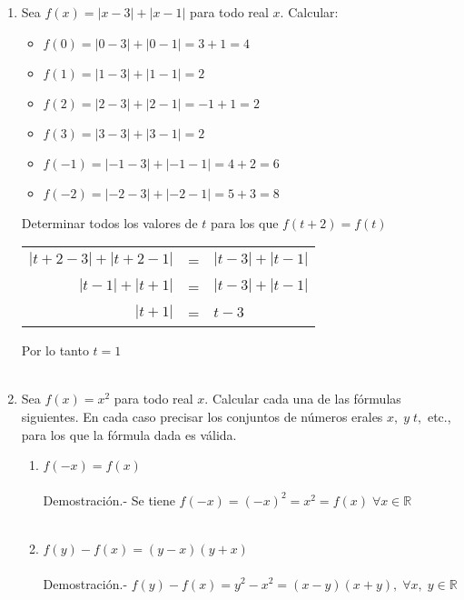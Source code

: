 \begin{enumerate}
        \item Sea $f(x)=|x-3|+|x-1|$ para todo real $x$. Calcular:\\
            \begin{itemize}
                \item $f(0) = |0-3|+|0-1| = 3 + 1 = 4$
                \item $f(1) = |1-3|+|1-1| = 2$
                \item $f(2) = |2-3|+|2-1| = -1 + 1 = 2$
                \item $f(3) = |3-3|+|3-1| = 2$
                \item $f(-1) = |-1-3|+|-1-1| = 4 + 2 = 6$
                \item $f(-2) = |-2-3|+|-2-1| = 5 + 3 = 8$\\
            \end{itemize}
            Determinar todos los valores de $t$ para los que $f(t+2)=f(t)$\\
            \begin{center}
                \begin{tabular}{r c l}
                    $|t+2-3| + |t+2-1|$&=&$|t-3| + |t-1|$\\
                    $|t-1|+|t+1|$&=&$|t-3|+|t-1|$\\
                    $|t+1|$&=&$t-3$\\
                \end{tabular}
            \end{center}
            Por lo tanto  $t=1$\\\\

        \item Sea $f(x)=x^2$  para todo real $x$. Calcular cada una de las fórmulas siguientes. En cada caso precisar los conjuntos de números erales $x, \; y \; t,$ etc., para los que la fórmula dada es válida.
            \begin{enumerate}[\bfseries (a)]
                \item $f(-x)=f(x)$ \\\\
                Demostración.- \; Se tiene $f(-x) = (-x)^2 = x^2 = f(x) \; \forall x \in \mathbb{R}$\\\\

                \item $f(y)-f(x)=(y-x)(y+x)$\\\\
                Demostración.- \; $f(y)-f(x)= y^2 - x^2 = (x-y)(x+y), \; \forall x, \; y \in \mathbb{R}$\\\\


\end{enumerate}
\end{enumerate}
